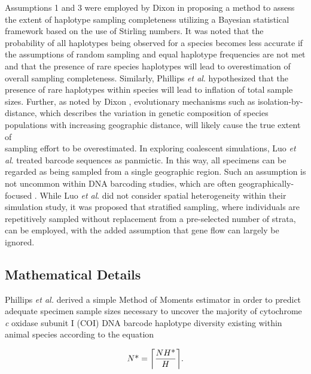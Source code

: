 Assumptions 1 and 3 were employed by Dixon \cite{dixon2006means} in proposing a method to assess the extent of haplotype sampling completeness utilizing a Bayesian statistical framework based on the use of Stirling numbers. It was noted that the probability of all haplotypes being observed for a species becomes less accurate if the assumptions of random sampling and equal haplotype frequencies are not met and that the presence of rare species haplotypes will lead to overestimation of overall sampling completeness. Similarly, Phillips \textit{et al}. \cite{phillips2015exploration} hypothesized that the presence of rare haplotypes within species will lead to inflation of total sample sizes. Further, as noted by Dixon \cite{dixon2006means}, evolutionary mechanisms such as isolation-by-distance, which describes the variation in genetic composition of species populations with increasing geographic distance, will likely cause the true extent of \\ sampling effort to be overestimated. In exploring coalescent simulations, Luo \textit{et al}. \cite{luo2015simulation} treated barcode sequences as panmictic. In this way, all specimens can be regarded as being sampled from a single geographic region. Such an assumption is not uncommon within DNA barcoding studies, which are often geographically-focused \cite{collins2013seven}. While Luo \textit{et al}. \cite{luo2015simulation} did not consider spatial heterogeneity within their simulation study, it was proposed that stratified sampling, where individuals are repetitively sampled without replacement from a pre-selected number of strata, can be employed, with the added assumption that gene flow can largely be ignored.



\subsection{Mathematical Details}

Phillips \textit{et al.} \cite{phillips2015exploration} derived a simple Method of Moments \cite{pearson1894contributions} estimator in order to predict adequate specimen sample sizes necessary to uncover the majority of cytochrome \textit{c} oxidase subunit I (COI) DNA barcode haplotype diversity existing within animal species according to the equation 

\begin{equation}
N\mbox{*} = \ceil*{\frac{NH\mbox{*}}{H}}.
\label{eqn}
\end{equation}



